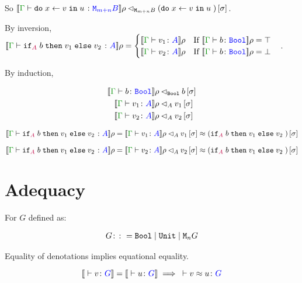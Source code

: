 \documentclass{Report}
\begin{document}
So $\logRel{\deno{\gtyperelation{\doin{x}{v}{u}}{\M{m+n}{B}}}\rho}{\M{m+n}{B}}{(\doin{x}{v}{u})\ssi}$.


\case{\vif}

By inversion, $\deno{\gtyperelation{\pifthenelse{A}{b}{v_1}{v_2}}{A}}\rho = \begin{cases}
    \deno{\gtyperelation{v_1}{A}}\rho \qt{If }\deno{\gtyperelation{b}{\B}}\rho = \top\\
    \deno{\gtyperelation{v_2}{A}}\rho \qt{If }\deno{\gtyperelation{b}{\B}}\rho = \bot
\end{cases}
$.

By induction,

\begin{align}
    \logRel{\deno{\gtyperelation{b}{\B}&}\rho}{\B}{b\ssi}\\
    \logRel{\deno{\gtyperelation{v_1}{A}&}\rho}{A}{v_1\ssi}\\
    \logRel{\deno{\gtyperelation{v_2}{A}&}\rho}{A}{v_2\ssi}
\end{align}

    \begin{equation}
        \logRel{\deno{\gtyperelation{\pifthenelse{A}{b}{v_1}{v_2}}{A}}\rho = \deno{\gtyperelation{v_1}{A}}\rho}{A}{v_1\ssi\beequiv (\pifthenelse{A}{b}{v_1}{v_2})\ssi}
    \end{equation}

\begin{equation}
    \logRel{\deno{\gtyperelation{\pifthenelse{A}{b}{v_1}{v_2}}{A}}\rho = \deno{\gtyperelation{v_2}{A}}\rho}{A}{v_2\ssi\beequiv (\pifthenelse{A}{b}{v_1}{v_2})\ssi}
\end{equation}

\section{Adequacy}
\begin{theorem}[Adequacy]
For $G$ defined as:

\begin{align}
    G\colon\colon= \texttt{Bool} \mid \texttt{Unit} \mid \texttt{M}_{n}{G}
\end{align}

Equality of denotations implies equational equality.

\begin{equation}
    \deno{\ztyperelation{v}{G}} = \deno{\ztyperelation{u}{G}} \implies \zberelation{v}{u}{G}
\end{equation}

\end{theorem}
\end{document}
